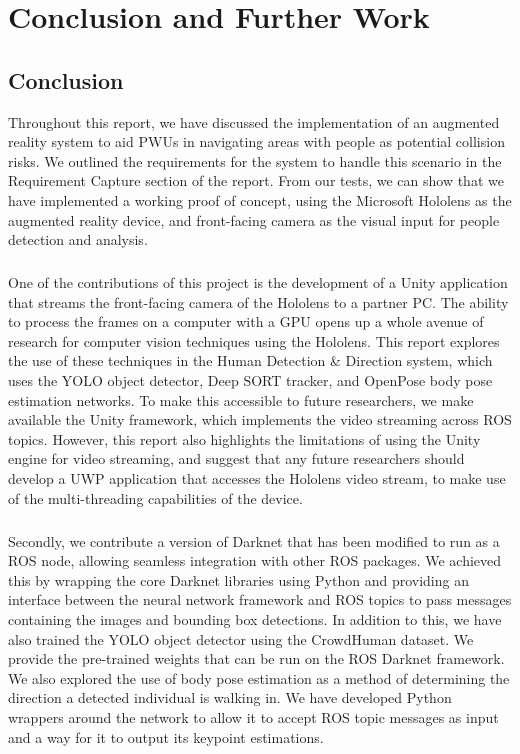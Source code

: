 \chapter{Conclusion and Further Work}

\section{Conclusion}
Throughout this report, we have discussed the implementation of an augmented reality system to aid PWUs in navigating areas with people as potential collision risks. We outlined the requirements for the system to handle this scenario in the Requirement Capture section of the report. From our tests, we can show that we have implemented a working proof of concept, using the Microsoft Hololens as the augmented reality device, and front-facing camera as the visual input for people detection and analysis.

\paragraph{}One of the contributions of this project is the development of a Unity application that streams the front-facing camera of the Hololens to a partner PC. The ability to process the frames on a computer with a GPU opens up a whole avenue of research for computer vision techniques using the Hololens. This report explores the use of these techniques in the Human Detection \& Direction system, which uses the YOLO object detector, Deep SORT tracker, and OpenPose body pose estimation networks. To make this accessible to future researchers, we make available the Unity framework, which implements the video streaming across ROS topics. However, this report also highlights the limitations of using the Unity engine for video streaming, and suggest that any future researchers should develop a UWP application that accesses the Hololens video stream, to make use of the multi-threading capabilities of the device.

\paragraph{}Secondly, we contribute a version of Darknet that has been modified to run as a ROS node, allowing seamless integration with other ROS packages. We achieved this by wrapping the core Darknet libraries using Python and providing an interface between the neural network framework and ROS topics to pass messages containing the images and bounding box detections. In addition to this, we have also trained the YOLO object detector using the CrowdHuman dataset. We provide the pre-trained weights that can be run on the ROS Darknet framework. We also explored the use of body pose estimation as a method of determining the direction a detected individual is walking in. We have developed Python wrappers around the network to allow it to accept ROS topic messages as input and a way for it to output its keypoint estimations.  

